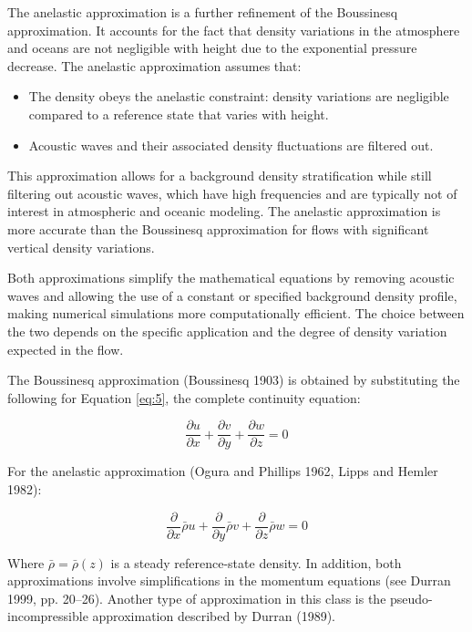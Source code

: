 \documentclass{article}
\begin{document}
The anelastic approximation is a further refinement of the Boussinesq approximation. It accounts for the fact that density variations in the atmosphere and oceans are not negligible with height due to the exponential pressure decrease. The anelastic approximation assumes that:
\begin{itemize}
\item The density obeys the anelastic constraint: density variations are negligible compared to a reference state that varies with height. 
\item Acoustic waves and their associated density fluctuations are filtered out.
\end{itemize}

This approximation allows for a background density stratification while still filtering out acoustic waves, which have high frequencies and are typically not of interest in atmospheric and oceanic modeling. The anelastic approximation is more accurate than the Boussinesq approximation for flows with significant vertical density variations.

Both approximations simplify the mathematical equations by removing acoustic waves and allowing the use of a constant or specified background density profile, making numerical simulations more computationally efficient. The choice between the two depends on the specific application and the degree of density variation expected in the flow.


The Boussinesq approximation (Boussinesq 1903) is obtained by substituting the following for Equation \ref{eq:5}, the complete continuity equation:

\begin{equation}
\frac{\partial u}{\partial x} + \frac{\partial v}{\partial y} + \frac{\partial w}{\partial z} = 0
\label{eq:33}
\end{equation}

For the anelastic approximation (Ogura and Phillips 1962, Lipps and Hemler 1982):

\begin{equation}
\frac{\partial}{\partial x}\bar{\rho}u + \frac{\partial}{\partial y}\bar{\rho}v + \frac{\partial}{\partial z}\bar{\rho}w = 0
\label{eq:34}
\end{equation}

Where $\bar{\rho} = \bar{\rho}(z)$ is a steady reference-state density. In addition, both approximations involve simplifications in the momentum equations (see Durran 1999, pp. 20--26). Another type of approximation in this class is the pseudo-incompressible approximation described by Durran (1989).
\end{document}
